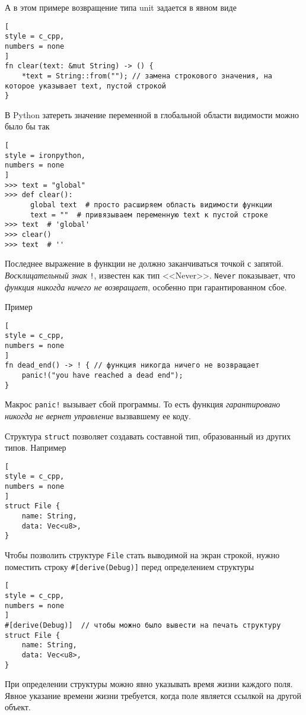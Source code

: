 \documentclass[%
	11pt,
	a4paper,
	utf8,
		]{article}
\begin{document}
А в этом примере возвращение типа unit задается в явном виде
\begin{lstlisting}[
style = c_cpp,
numbers = none
]
fn clear(text: &mut String) -> () {
    *text = String::from(""); // замена строкового значения, на которое указывает text, пустой строкой
}
\end{lstlisting}

В Python затереть значение переменной в глобальной области видимости можно было бы так
\begin{lstlisting}[
style = ironpython,
numbers = none
]
>>> text = "global"
>>> def clear():
      global text  # просто расширяем область видимости функции
      text = ""  # привязываем переменную text к пустой строке
>>> text  # 'global'
>>> clear()
>>> text  # '' 
\end{lstlisting}

Последнее выражение в функции не должно заканчиваться точкой с запятой. \emph{Восклицательный знак} \verb|!|, известен как тип <<Never>>. \verb|Never| показывает, что \emph{функция никогда ничего не возвращает}, особенно при гарантированном сбое.

Пример
\begin{lstlisting}[
style = c_cpp,
numbers = none
]
fn dead_end() -> ! { // функция никогда ничего не возвращает
    panic!("you have reached a dead end");
}
\end{lstlisting}

Макрос \verb|panic!| вызывает сбой программы. То есть функция \emph{гарантировано никогда не вернет управление} вызвавшему ее коду.

Структура \texttt{struct} позволяет создавать составной тип, образованный из других типов. Например
\begin{lstlisting}[
style = c_cpp,
numbers = none
]
struct File {
    name: String,
    data: Vec<u8>,
}
\end{lstlisting}

Чтобы позволить структуре \texttt{File} стать выводимой на экран строкой, нужно поместить строку \verb|#[derive(Debug)]| перед определением структуры

\begin{lstlisting}[
style = c_cpp,
numbers = none
]
#[derive(Debug)]  // чтобы можно было вывести на печать структуру
struct File {
	name: String,
	data: Vec<u8>,
}
\end{lstlisting}

При определении структуры можно явно указывать время жизни каждого поля. Явное указание времени жизни требуется, когда поле является ссылкой на другой объект.
\end{document}

